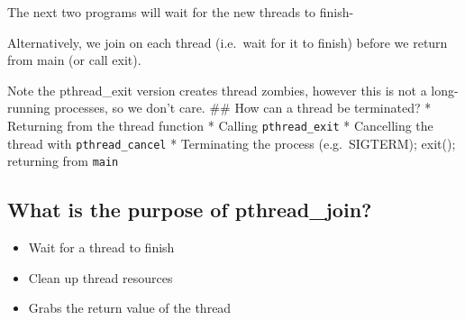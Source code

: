 The next two programs will wait for the new threads to finish-

\begin{Shaded}
\begin{Highlighting}[]
 
  \NormalTok{);}
  \NormalTok{);}

\NormalTok{\}}
\end{Highlighting}
\end{Shaded}

Alternatively, we join on each thread (i.e.~wait for it to finish)
before we return from main (or call exit).

\begin{Shaded}
\begin{Highlighting}[]
 
  \NormalTok{);}
  \NormalTok{);}
   \NormalTok{;}
\NormalTok{\}}
\end{Highlighting}
\end{Shaded}

Note the pthread\_exit version creates thread zombies, however this is
not a long-running processes, so we don't care. \#\# How can a thread be
terminated? * Returning from the thread function * Calling
\texttt{pthread\_exit} * Cancelling the thread with
\texttt{pthread\_cancel} * Terminating the process (e.g.~SIGTERM);
exit(); returning from \texttt{main}

\subsection{What is the purpose of
pthread\_join?}\label{what-is-the-purpose-of-pthreadux5fjoin}

\begin{itemize}
\tightlist
\item
  Wait for a thread to finish
\item
  Clean up thread resources
\item
  Grabs the return value of the thread
\end{itemize}

